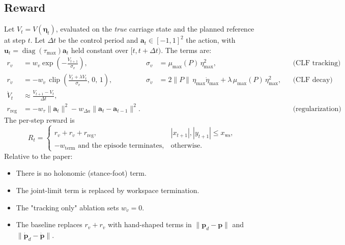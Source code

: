 \subsection*{Reward}
Let $V_t = V(\boldsymbol{\eta}_t)$, evaluated on the \emph{true} carriage state and the planned reference at step $t$.
Let $\Delta t$ be the control period and $\mathbf{a}_t \in [-1,1]^2$ the action, with $\mathbf{u}_t = \operatorname{diag}(\tau_{\max}) \mathbf{a}_t$
held constant over $[t, t+\Delta t)$. The terms are:
\begin{align}
r_v &= w_v \exp\!\left( -\frac{V_{t+1}}{\sigma_v} \right),
  & \sigma_v &= \mu_{\max}(P)\, \eta_{\max}^2,
  && \text{(CLF tracking)} \\
r_{\dot v} &= -w_{\dot v}\, \operatorname{clip}\!\left( \frac{\dot V_t + \lambda V_t}{\sigma_{\dot v}},\, 0,\, 1 \right),
  & \sigma_{\dot v} &= 2\|P\|\, \eta_{\max} \dot\eta_{\max} + \lambda\, \mu_{\max}(P)\, \eta_{\max}^2,
  && \text{(CLF decay)} \\
\dot V_t &\approx \frac{V_{t+1} - V_t}{\Delta t}, \\
r_{\mathrm{reg}} &= -w_\tau \|\mathbf{a}_t\|^2 - w_{\Delta a} \|\mathbf{a}_t - \mathbf{a}_{t-1}\|^2.
  &&&& \text{(regularization)}
\end{align}
The per-step reward is
\begin{equation}
R_t =
\begin{cases}
r_v + r_{\dot v} + r_{\mathrm{reg}}, & |x_{t+1}|, |y_{t+1}| \le x_{\mathrm{ws}}, \\
-w_{\mathrm{term}} \text{ and the episode terminates}, & \text{otherwise.}
\end{cases}
\end{equation}
Relative to the paper:
\begin{itemize}
  \item There is no holonomic (stance-foot) term.
  \item The joint-limit term is replaced by workspace termination.
  \item The "tracking only" ablation sets $w_{\dot v} = 0$.
  \item The baseline replaces $r_v + r_{\dot v}$ with hand-shaped terms in $\|\mathbf{p}_d - \mathbf{p}\|$ and $\|\dot{\mathbf{p}}_d - \dot{\mathbf{p}}\|$.
\end{itemize}

